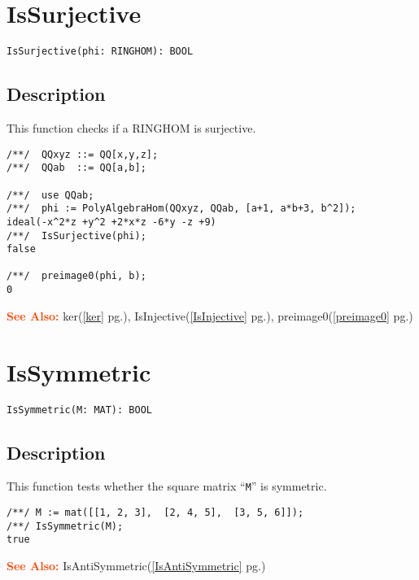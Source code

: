 \documentclass[a4paper]{mybook}
\newenvironment{command}{}{} %
\newcommand\SeeAlso{\par\textcolor{OrangeRed}{\textbf{\large See Also: }}}
\begin{document}
\section{IsSurjective}
\label{IsSurjective}
\begin{command} %


\begin{Verbatim}[label=syntax, rulecolor=\color{MidnightBlue},
frame=single]
IsSurjective(phi: RINGHOM): BOOL
\end{Verbatim}


\subsection*{Description}

This function checks if a RINGHOM is surjective.
\begin{Verbatim}[label=example, rulecolor=\color{PineGreen}, frame=single]
/**/  QQxyz ::= QQ[x,y,z];
/**/  QQab  ::= QQ[a,b];

/**/  use QQab;
/**/  phi := PolyAlgebraHom(QQxyz, QQab, [a+1, a*b+3, b^2]);
ideal(-x^2*z +y^2 +2*x*z -6*y -z +9)
/**/  IsSurjective(phi);
false

/**/  preimage0(phi, b);
0
\end{Verbatim}


\SeeAlso %
  ker(\ref{ker} pg.\pageref{ker}), 
    IsInjective(\ref{IsInjective} pg.\pageref{IsInjective}), 
    preimage0(\ref{preimage0} pg.\pageref{preimage0})
\end{command} %

\section{IsSymmetric}
\label{IsSymmetric}
\begin{command} %


\begin{Verbatim}[label=syntax, rulecolor=\color{MidnightBlue},
frame=single]
IsSymmetric(M: MAT): BOOL
\end{Verbatim}


\subsection*{Description}

This function tests whether the square matrix ``\verb&M&'' is symmetric.
\begin{Verbatim}[label=example, rulecolor=\color{PineGreen}, frame=single]
/**/ M := mat([[1, 2, 3],  [2, 4, 5],  [3, 5, 6]]);
/**/ IsSymmetric(M);
true
\end{Verbatim}


\SeeAlso %
  IsAntiSymmetric(\ref{IsAntiSymmetric} pg.\pageref{IsAntiSymmetric})
\end{command} %
\end{document}
